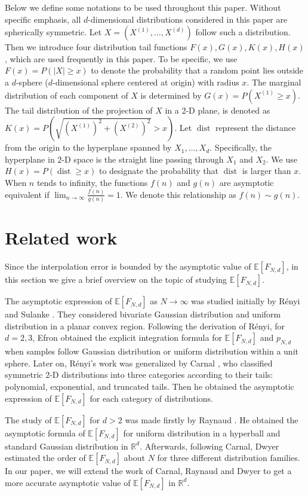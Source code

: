 \documentclass[conference,a4paper]{IEEEtran}
\DeclareMathOperator{\dist}{dist}
\def\E{\mathbb{E}}
\def\R{\mathbb{R}}
\begin{document}
Below we define some notations to be used throughout this paper.
Without specific emphasis, all $d$-dimensional distributions considered in this paper are spherically symmetric.
Let $X=(X^{(1)},\dots, X^{(d)})$ follow such a distribution.
Then we introduce four distribution tail functions $F(x),G(x),K(x),H(x)$,
which are used frequently in this paper. To be specific, we use $F(x)=P(|X|\geq x)$ to denote the probability that a random point lies outside
a $d$-sphere ($d$-dimensional sphere centered at origin) with radius $x$.
The marginal distribution of each component of $X$ is determined by $G(x)=P(X^{(1)}\geq x)$.
The tail distribution of the projection of $X$ in a 2-D plane, is denoted as $K(x)=P(\sqrt{(X^{(1)})^2+(X^{(2)})^2}>x)$.
Let $\dist$ represent the distance from the origin to the hyperplane spanned by $X_1, \dots, X_d$.
Specifically, the hyperplane in 2-D space is the straight line passing through $X_1$ and $X_2$.
We use $H(x)=P(\dist\geq x)$ to designate the probability that $\dist$ is larger than $x$.
When $n$ tends to infinity, the functions $f(n)$ and $g(n)$ are asymptotic equivalent if $\lim_{n\to \infty} \frac{f(n)}{g(n)}=1$.
We denote this relationship as $f(n) \sim g(n)$.

\section{Related work}
Since the interpolation error is bounded by
the asymptotic value of $\E[F_{N,d}]$,
in this section we give a brief overview on the topic of studying $\E[F_{N,d}]$.

The asymptotic expression of $\E[F_{N,d}]$ as $N\to \infty$
was studied initially by R{\'e}nyi and Sulanke \cite{renyi1963konvexe}.
They considered
bivariate Gaussian distribution and uniform distribution
in a planar convex region.
Following the derivation of R{\'e}nyi, for $d=2,3$, Efron \cite{efron1965convex} obtained the explicit integration formula for $\E[F_{N,d}]$ and $p_{N,d}$ 
when samples follow Gaussian distribution or uniform distribution within a unit sphere.
Later on,  R{\'e}nyi's work was generalized by
Carnal \cite{carnal1970konvexe}, who
classified symmetric 2-D distributions
into three categories according to their tails:
polynomial, exponential, and truncated tails.
Then he obtained the asymptotic expression of $\E[F_{N,d}]$
for each category of distributions.

The study of $\E[F_{N,d}]$ for $d>2$ was made firstly by
Raynaud
\cite{raynaud1970enveloppe}.
He obtained the asymptotic formula of $\E[F_{N,d}]$
for uniform distribution in a hyperball
and standard Gaussian distribution in $\mathbb{R}^d$.
Afterwards, following Carnal, Dwyer \cite{dwyer1991convex}
estimated the order of $\E[F_{N,d}]$ about $N$
for three different distribution families.
In our paper, we will extend the work of Carnal, Raynaud and Dwyer
to get a more accurate asymptotic value of $\E[F_{N,d}]$ in $\R^d$.
\end{document}
